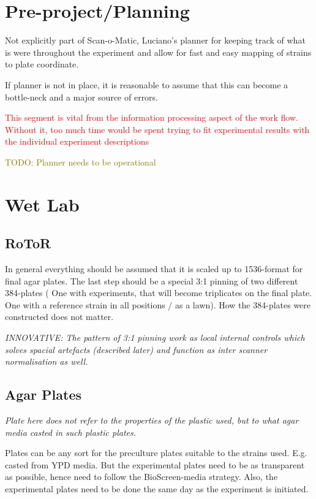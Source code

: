 \documentclass{article}
\newcommand{\comment}[1]{\textcolor{red}{#1}}
\newcommand{\todo}[1]{\textcolor{olive}{TODO: #1}}
\newcommand{\innovative}[1]{\emph{INNOVATIVE: #1}}
\begin{document}
\section{Pre-project/Planning}

Not explicitly part of Scan-o-Matic, Luciano's planner for keeping track of
what is were throughout the experiment and allow for fast and easy mapping of
strains to plate coordinate.

If planner is not in place, it is reasonable to assume that this can become a
bottle-neck and a major source of errors.

\comment{This segment is vital from the information processing aspect of 
the work flow. Without it, too much time would be spent trying to fit
experimental results with the individual experiment descriptions}

\todo{Planner needs to be operational}

\section{Wet Lab}

\subsection{RoToR}

In general everything should be assumed that it is scaled up to 1536-format for
final agar plates.
The last step should be a special 3:1 pinning of two different 384-plates (
One with experiments, that will become triplicates on the final plate.
One with a reference strain in all positions / as a lawn).
How the 384-plates were constructed does not matter.

\innovative{The pattern of 3:1 pinning work as local internal controls 
which solves spacial artefacts (described later) and function as inter
scanner normalisation as well.}

\subsection{Agar Plates}

\emph{Plate here does not refer to the properties of the plastic used,
but to what agar media casted in such plastic plates.}

Plates can be any sort for the preculture plates suitable to the strains used.
E.g. casted from YPD media.
But the experimental plates need to be as transparent as possible, hence
need to follow the BioScreen-media strategy.
Also, the experimental plates need to be done the same day as the 
experiment is initiated.
\end{document}
